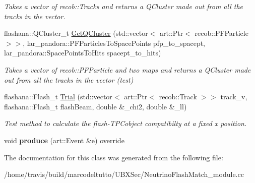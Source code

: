 \begin{DoxyCompactItemize}
\begin{DoxyCompactList}\small\item\em \-Takes a vector of recob\-::\-Tracks and returns a \-Q\-Cluster made out from all the tracks in the vector. \end{DoxyCompactList}\item 
\hypertarget{classNeutrinoFlashMatch_a93132a117b6ea907ba95bba4a6af6107}{flashana\-::\-Q\-Cluster\-\_\-t \hyperlink{classNeutrinoFlashMatch_a93132a117b6ea907ba95bba4a6af6107}{\-Get\-Q\-Cluster} (std\-::vector$<$ art\-::\-Ptr$<$ recob\-::\-P\-F\-Particle $>$$>$, lar\-\_\-pandora\-::\-P\-F\-Particles\-To\-Space\-Points pfp\-\_\-to\-\_\-spacept, lar\-\_\-pandora\-::\-Space\-Points\-To\-Hits spacept\-\_\-to\-\_\-hits)}\label{classNeutrinoFlashMatch_a93132a117b6ea907ba95bba4a6af6107}

\begin{DoxyCompactList}\small\item\em \-Takes a vector of recob\-::\-P\-F\-Particle and two maps and returns a \-Q\-Cluster made out from all the tracks in the vector (test) \end{DoxyCompactList}\item 
\hypertarget{classNeutrinoFlashMatch_aa957152a8c232e4b23cc7544aa6bfdd1}{flashana\-::\-Flash\-\_\-t \hyperlink{classNeutrinoFlashMatch_aa957152a8c232e4b23cc7544aa6bfdd1}{\-Trial} (std\-::vector$<$ art\-::\-Ptr$<$ recob\-::\-Track $>$$>$ track\-\_\-v, flashana\-::\-Flash\-\_\-t flash\-Beam, double \&\-\_\-chi2, double \&\-\_\-ll)}\label{classNeutrinoFlashMatch_aa957152a8c232e4b23cc7544aa6bfdd1}

\begin{DoxyCompactList}\small\item\em \-Test method to calculate the flash-\/\-T\-P\-Cobject compatibilty at a fixed x position. \end{DoxyCompactList}\item 
\hypertarget{classNeutrinoFlashMatch_a00578af5672ff925f80c1b9482c8b4ff}{void {\bfseries produce} (art\-::\-Event \&e) override}\label{classNeutrinoFlashMatch_a00578af5672ff925f80c1b9482c8b4ff}

\end{DoxyCompactItemize}


\-The documentation for this class was generated from the following file\-:\begin{DoxyCompactItemize}
\item 
/home/travis/build/marcodeltutto/\-U\-B\-X\-Sec/\-Neutrino\-Flash\-Match\-\_\-module.\-cc\end{DoxyCompactItemize}
